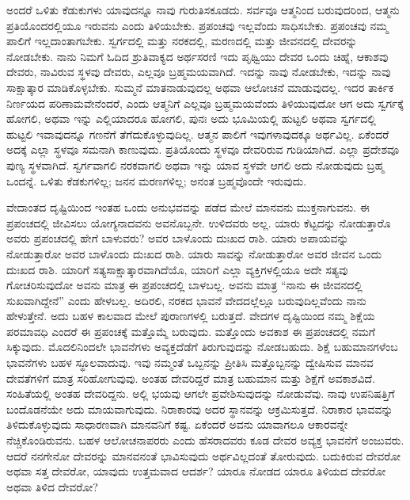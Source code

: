 \vskip 6pt

ಅಂದರೆ ಒಳಿತು ಕೆಡುಕುಗಳು ಯಾವುದನ್ನೂ ನಾವು ಗುರುತಿಸಕೂಡದು. ಸರ್ವವೂ ಆತ್ಮನಿಂದ ಬರುವುದರಿಂದ, ಆತ್ಮನು ಪ್ರತಿಯೊಂದರಲ್ಲಿಯೂ ಇರುವನು ಎಂದು ತಿಳಿಯಬೇಕು. ಪ್ರಪಂಚವು ಇಲ್ಲವೆಂದು ಸಾಧಿಸಬೇಕು. ಪ್ರಪಂಚವು ನಮ್ಮ ಪಾಲಿಗೆ ಇಲ್ಲದಾಂತಾಗಬೇಕು. ಸ್ವರ್ಗದಲ್ಲಿ ಮತ್ತು ನರಕದಲ್ಲಿ, ಮರಣದಲ್ಲಿ ಮತ್ತು ಜೀವನದಲ್ಲಿ ದೇವರನ್ನು ನೋಡಬೇಕು. ನಾನು ನಿಮಗೆ ಓದಿದ ಶ್ರುತಿವಾಕ್ಯದ ಅರ್ಥಸರಣಿ ಇದು ಪೃಥ್ವಿಯು ದೇವರ ಒಂದು ಚಿಹ್ನೆ, ಆಕಾಶವು ದೇವರು, ನಾವಿರುವ ಸ್ಥಳವು ದೇವರು, ಎಲ್ಲವೂ ಬ್ರಹ್ಮಮಯವಾಗಿದೆ. ಇದನ್ನು ನಾವು ನೋಡಬೇಕು, ಇದನ್ನು ನಾವು ಸಾಕ್ಷಾತ್ಕಾರ ಮಾಡಿಕೊಳ್ಳಬೇಕು. ಸುಮ್ಮನೆ ಮಾತನಾಡುವುದಲ್ಲ ಅಥವಾ ಆಲೋಚನೆ ಮಾಡುವುದಲ್ಲ. ಇದರ ತಾರ್ಕಿಕ ನಿರ್ಣಯದ ಪರಿಣಾಮವೇನೆಂದರೆ, ಎಂದು ಆತ್ಮನಿಗೆ ಎಲ್ಲವೂ ಬ್ರಹ್ಮಮಯವೆಂದು ತಿಳಿಯುವುದೋ ಆಗ ಅದು ಸ್ವರ್ಗಕ್ಕೆ ಹೋಗಲಿ, ಅಥವಾ ಇನ್ನು ಎಲ್ಲಿಯಾದರೂ ಹೋಗಲಿ, ಪುನಃ ಅದು ಭೂಮಿಯಲ್ಲಿ ಹುಟ್ಟಲಿ ಅಥವಾ ಸ್ವರ್ಗದಲ್ಲಿ ಹುಟ್ಟಲಿ ಇವಾವುದನ್ನೂ ಗಣನೆಗೆ ತೆಗೆದುಕೊಳ್ಳುವುದಿಲ್ಲ. ಆತ್ಮನ ಪಾಲಿಗೆ ಇವುಗಳಾವುದಕ್ಕೂ ಅರ್ಥವಿಲ್ಲ. ಏಕೆಂದರೆ ಅದಕ್ಕೆ ಎಲ್ಲಾ ಸ್ಥಳವೂ ಸಮನಾಗಿ ಕಾಣುವುದು. ಪ್ರತಿಯೊಂದು ಸ್ಥಳವೂ ದೇವರಿರುವ ಗುಡಿಯಾಗಿದೆ. ಎಲ್ಲಾ ಪ್ರದೇಶವೂ ಪುಣ್ಯ ಸ್ಥಳವಾಗಿದೆ. ಸ್ವರ್ಗವಾಗಲಿ ನರಕವಾಗಲಿ ಅಥವಾ ಇನ್ನು ಯಾವ ಸ್ಥಳವೇ ಆಗಲಿ ಅದು ನೋಡುವುದು ಬ್ರಹ್ಮ ಒಂದನ್ನೆ. ಒಳಿತು ಕೆಡಕುಗಳಿಲ್ಲ; ಜನನ ಮರಣಗಳಿಲ್ಲ; ಅನಂತ ಬ್ರಹ್ಮವೊಂದೇ ಇರುವುದು. 

\vskip 6pt

ವೇದಾಂತದ ದೃಷ್ಟಿಯಿಂದ ಇಂತಹ ಒಂದು ಅನುಭವವನ್ನು ಪಡೆದ ಮೇಲೆ ಮಾನವನು ಮುಕ್ತನಾಗುವನು. ಈ ಪ್ರಪಂಚದಲ್ಲಿ ಜೀವಿಸಲು ಯೋಗ್ಯನಾದವನು ಅವನೊಬ್ಬನೇ. ಉಳಿದವರು ಅಲ್ಲ. ಯಾರು ಕೆಟ್ಟದನ್ನು ನೋಡುತ್ತಾರೊ ಅವರು ಪ್ರಪಂಚದಲ್ಲಿ ಹೇಗೆ ಬಾಳುವರು? ಅವರ ಬಾಳೊಂದು ದುಃಖದ ರಾಶಿ. ಯಾರು ಅಪಾಯವನ್ನು ನೋಡುತ್ತಾರೋ ಅವರ ಬಾಳೊಂದು ದುಃಖದ ರಾಶಿ. ಯಾರು ಸಾವನ್ನು ನೋಡುತ್ತಾರೋ ಅವರ ಜೀವನ ಒಂದು ದುಃಖದ ರಾಶಿ. ಯಾರಿಗೆ ಸತ್ಯಸಾಕ್ಷಾತ್ಕಾರವಾಗಿದೆಯೊ, ಯಾರಿಗೆ ಎಲ್ಲಾ ವ್ಯಕ್ತಿಗಳಲ್ಲಿಯೂ ಅದೇ ಸತ್ಯವು ಗೋಚರಿಸುವುದೋ ಅವನು ಮಾತ್ರ ಈ ಪ್ರಪಂಚದಲ್ಲಿ ಬಾಳಬಲ್ಲ. ಅವನು ಮಾತ್ರ “ನಾನು ಈ ಜೀವನದಲ್ಲಿ ಸುಖವಾಗಿದ್ದೇನೆ” ಎಂದು ಹೇಳಬಲ್ಲ. ಅದಿರಲಿ, ನರಕದ ಭಾವನೆ ವೇದದಲ್ಲೆಲ್ಲೂ ಬರುವುದಿಲ್ಲವೆಂದು ನಾನು ಹೇಳುತ್ತೇನೆ. ಅದು ಬಹಳ ಕಾಲವಾದ ಮೇಲೆ ಪುರಾಣಗಳಲ್ಲಿ ಬರುತ್ತದೆ. ವೇದಗಳ ದೃಷ್ಟಿಯಿಂದ ನಮ್ಮ ಶಿಕ್ಷೆಯ ಪರಮಾವಧಿ ಎಂದರೆ ಈ ಪ್ರಪಂಚಕ್ಕೆ ಮತ್ತೊಮ್ಮೆ ಬರುವುದು. ಮತ್ತೊಂದು ಅವಕಾಶ ಈ ಪ್ರಪಂಚದಲ್ಲಿ ನಮಗೆ ಸಿಕ್ಕುವುದು. ಮೊದಲಿನಿಂದಲೇ ಭಾವನೆಗಳು ಅವ್ಯಕ್ತದೆಡೆಗೆ ತಿರುಗುವುದನ್ನು ನೋಡಬಹುದು. ಶಿಕ್ಷೆ ಬಹುಮಾನಗಳೆಂಬ ಭಾವನೆಗಳು ಬಹಳ ಸ್ಥೂಲವಾದುವು. ಇವು ನಮ್ಮಂತೆ ಒಬ್ಬನನ್ನು ಪ್ರೀತಿಸಿ ಮತ್ತೊಬ್ಬನನ್ನು ದ್ವೇಷಿಸುವ ಮಾನವ ದೇವತೆಗಳಿಗೆ ಮಾತ್ರ ಸರಿಹೋಗುವುವು. ಅಂತಹ ದೇವರಿದ್ದರೆ ಮಾತ್ರ ಬಹುಮಾನ ಮತ್ತು ಶಿಕ್ಷೆಗೆ ಅವಕಾಶವಿದೆ. ಸಂಹಿತೆಯಲ್ಲಿ ಅಂತಹ ದೇವರಿದ್ದನು. ಅಲ್ಲಿ ಭಯವು ಆಗಲೇ ಪ್ರವೇಶಿಸುವುದನ್ನು ನೋಡುವೆವು. ನಾವು ಉಪನಿಷತ್ತಿಗೆ ಬಂದೊಡನೆಯೇ ಅದು ಮಾಯವಾಗುವುದು. ನಿರಾಕಾರವು ಅದರ ಸ್ಥಾನವನ್ನು ಆಕ್ರಮಿಸುತ್ತದೆ. ನಿರಾಕಾರ ಭಾವವನ್ನು ತಿಳಿದುಕೊಳ್ಳುವುದು ಸಾಧಾರಣವಾಗಿ ಮಾನವನಿಗೆ ಕಷ್ಟ. ಏಕೆಂದರೆ ಅವನು ಯಾವಾಗಲೂ ಆಕಾರವನ್ನೇ ನೆಚ್ಚಿಕೊಂಡಿರುವನು. ಬಹಳ ಆಲೋಚನಾಪರರು ಎಂದು ಹೆಸರಾದವರು ಕೂಡ ದೇವರ ಅವ್ಯಕ್ತ ಭಾವನೆಗೆ ಅಂಜುವರು. ಆದರೆ ನನಗೇನೋ ದೇವರನ್ನು ಮಾನವನಂತೆ ಭಾವಿಸುವುದು ಅರ್ಥವಿಲ್ಲದಂತೆ ತೋರುವುದು. ಬದುಕಿರುವ ದೇವರೋ ಅಥವಾ ಸತ್ತ ದೇವರೋ, ಯಾವುದು ಉತ್ತಮವಾದ ಆದರ್ಶ? ಯಾರೂ ನೋಡದ ಯಾರೂ ತಿಳಿಯದ ದೇವರೋ ಅಥವಾ ತಿಳಿದ ದೇವರೋ?

